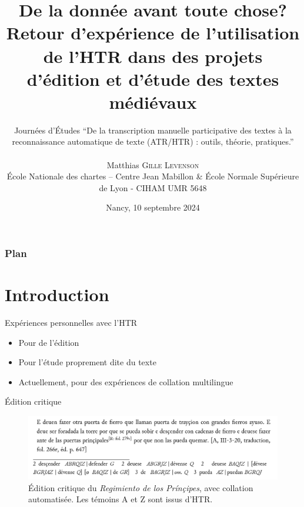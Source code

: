 \documentclass[11pt,aspectratio=169]{beamer}
\date[10/09/2024]{Nancy, 10 septembre 2024}
\author[Matthias \textsc{Gille Levenson}]{Journées d'Études \enquote{De la transcription manuelle participative des textes à la reconnaissance automatique de texte (ATR/HTR) : outils, théorie, pratiques.}\\~\\ Matthias \textsc{Gille Levenson}\\   {\scriptsize École Nationale des chartes -- Centre Jean Mabillon \& École Normale Supérieure de Lyon - CIHAM UMR 5648}\vspace{-.5cm}%
}
\title[De la donnée avant toute chose?]{De la donnée avant toute chose? Retour d'expérience de l'utilisation de l'HTR dans des projets d'édition et d'étude des textes médiévaux}
\begin{document}
\maketitle





\begin{frame}
\frametitle{Plan} %
\tableofcontents %
\end{frame}


\section{Introduction}
\begin{frame}{Expériences personnelles avec l'HTR}

\begin{itemize}
\item Pour de l'édition
\item Pour l'étude proprement dite du texte
\item Actuellement, pour des expériences de collation multilingue
\end{itemize}

\end{frame}

\begin{frame}{Édition critique}
\begin{figure}
\includegraphics[width=1\textwidth]{img/base_a.png}
\caption{Édition critique du \textit{Regimiento de los Prínçipes}, avec collation automatisée. Les témoins A et Z sont issus d'HTR.}
\end{figure}
\end{frame}
\end{document}

